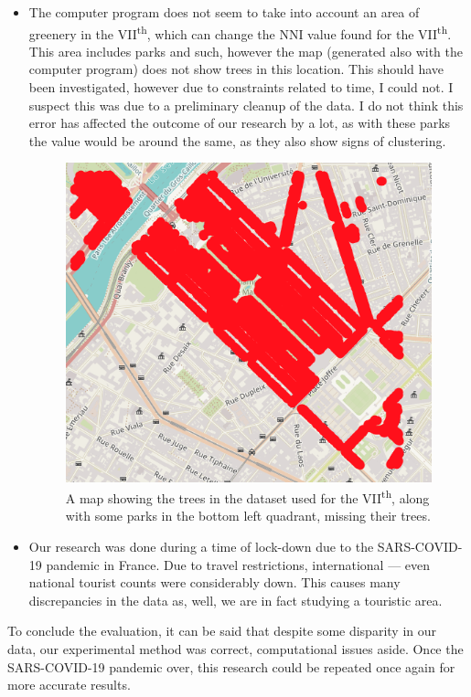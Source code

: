 \documentclass[11pt,letterpaper]{article}
\begin{document}
\begin{itemize}

    \item The computer program does not seem to take into account an area of greenery in the VII\textsuperscript{th}, which can change the NNI value found for the VII\textsuperscript{th}. This area includes parks and such, however the map (generated also with the computer program) does not show trees in this location. This should have been investigated, however due to constraints related to time, I could not. I suspect this was due to a preliminary cleanup of the data. I do not think this error has affected the outcome of our research by a lot, as with these parks the value would be around the same, as they also show signs of clustering.

          \begin{figure}[H]
              \centering
              \includegraphics[width=0.5\linewidth]{media/boundingerror.png}
              \caption{A map showing the trees in the dataset used for the VII\textsuperscript{th}, along with some parks in the bottom left quadrant, missing their trees.}
          \end{figure}

    \item Our research was done during a time of lock-down due to the SARS-COVID-19 pandemic in France. Due to travel restrictions, international --- even national tourist counts were considerably down. This causes many discrepancies in the data as, well, we are in fact studying a touristic area.

\end{itemize}

To conclude the evaluation, it can be said that despite some disparity in our data, our experimental method was correct, computational issues aside. Once the SARS-COVID-19 pandemic over, this research could be repeated once again for more accurate results.
\end{document}
